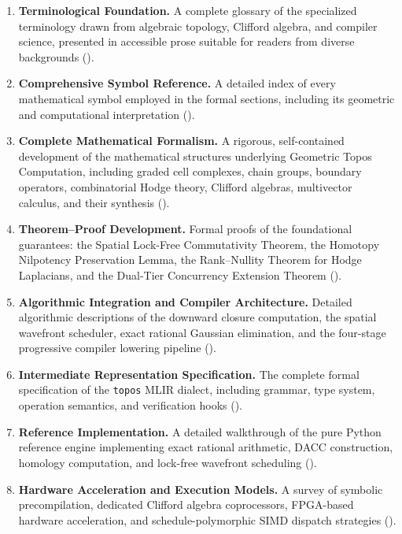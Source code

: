 \documentclass[manuscript, nonacm, review=false]{acmart}
\theoremstyle{definition}
\theoremstyle{plain}
\begin{document}
\begin{enumerate}[label=\textbf{C\arabic*.}]
    \item \textbf{Terminological Foundation.} A complete glossary of the specialized terminology drawn from algebraic topology, Clifford algebra, and compiler science, presented in accessible prose suitable for readers from diverse backgrounds ().
    
    \item \textbf{Comprehensive Symbol Reference.} A detailed index of every mathematical symbol employed in the formal sections, including its geometric and computational interpretation ().
    
    \item \textbf{Complete Mathematical Formalism.} A rigorous, self-contained development of the mathematical structures underlying Geometric Topos Computation, including graded cell complexes, chain groups, boundary operators, combinatorial Hodge theory, Clifford algebras, multivector calculus, and their synthesis ().
    
    \item \textbf{Theorem--Proof Development.} Formal proofs of the foundational guarantees: the Spatial Lock-Free Commutativity Theorem, the Homotopy Nilpotency Preservation Lemma, the Rank--Nullity Theorem for Hodge Laplacians, and the Dual-Tier Concurrency Extension Theorem ().
    
    \item \textbf{Algorithmic Integration and Compiler Architecture.} Detailed algorithmic descriptions of the downward closure computation, the spatial wavefront scheduler, exact rational Gaussian elimination, and the four-stage progressive compiler lowering pipeline ().
    
    \item \textbf{Intermediate Representation Specification.} The complete formal specification of the \texttt{topos} MLIR dialect, including grammar, type system, operation semantics, and verification hooks ().
    
    \item \textbf{Reference Implementation.} A detailed walkthrough of the pure Python reference engine implementing exact rational arithmetic, DACC construction, homology computation, and lock-free wavefront scheduling ().
    
    \item \textbf{Hardware Acceleration and Execution Models.} A survey of symbolic precompilation, dedicated Clifford algebra coprocessors, FPGA-based hardware acceleration, and schedule-polymorphic SIMD dispatch strategies ().
    

\end{enumerate}
\end{document}
